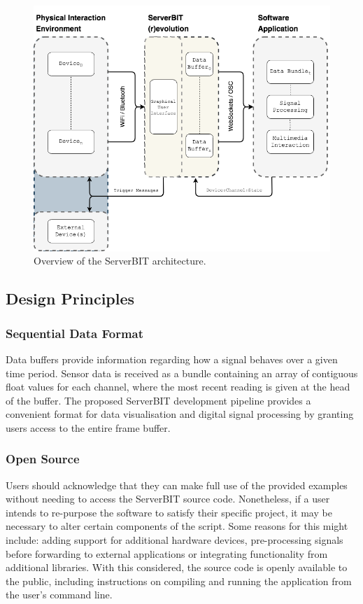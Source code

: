 \begin{figure}[htbp]
  \centering
    \includegraphics[width=\textwidth]{Chapters/Figures/technical/ServerBIT/ServerBIT_Archietecture_EXT.png}
    \caption{Overview of the ServerBIT architecture.}
    \label{fig:ServerBIT_architecture}
\end{figure}

\subsection{Design Principles}

\subsubsection*{Sequential Data Format}
Data buffers provide information regarding how a signal behaves over a given time period. Sensor data is received as a bundle containing an array of contiguous float values for each channel, where the most recent reading is given at the head of the buffer. The proposed ServerBIT development pipeline provides a convenient format for data visualisation and digital signal processing by granting users access to the entire frame buffer.

\subsubsection*{Open Source}
Users should acknowledge that they can make full use of the provided examples without needing to access the ServerBIT source code. Nonetheless, if a user intends to re-purpose the software to satisfy their specific project, it may be necessary to alter certain components of the script. Some reasons for this might include: adding support for additional hardware devices, pre-processing signals before forwarding to external applications or integrating functionality from additional libraries. With this considered, the source code is openly available to the public, including instructions on compiling and running the application from the user's command line.

